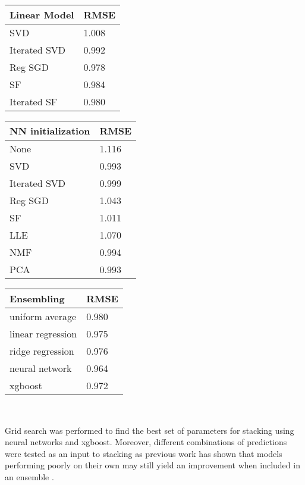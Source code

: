 \documentclass[10pt,conference,compsocconf]{IEEEtran}
\begin{document}
\begin{table*}[ht!]
	\label{table:model_results}
    \centering
    \footnotesize
    \caption{Validation scores of individual models}
    \begin{tabular}[t]{|l|l|}
    \hline
    Linear Model & RMSE \\ \hline \hline
    SVD				&1.008\\ \hline
    Iterated SVD	&0.992 \\ \hline
    Reg SGD			&0.978\\ \hline
    SF				&0.984 \\ \hline
    Iterated SF		&0.980\\ \hline
    \end{tabular}
    \qquad
    \begin{tabular}[t]{|l|l|}
    \hline
    NN initialization  & RMSE  \\ \hline \hline
    None     		& 1.116 \\ \hline
    SVD             & 0.993 \\ \hline
    Iterated SVD    & 0.999 \\ \hline
    Reg SGD 		& 1.043 \\ \hline
    SF              & 1.011 \\ \hline
    LLE             & 1.070  \\ \hline
    NMF             & 0.994 \\ \hline
    PCA             & 0.993 \\ \hline
    \end{tabular}
    \qquad
    \begin{tabular}[t]{|l|l|}
    \hline
    Ensembling & RMSE  \\ \hline
    uniform average     & 0.980 \\ \hline
    linear regression             & 0.975 \\ \hline
    ridge regression    & 0.976 \\ \hline
    neural network             & 0.964 \\ \hline
    xgboost             & 0.972 \\ \hline
    \end{tabular}
    \\
\end{table*}

Grid search was performed to find the best set of parameters for stacking using neural networks and xgboost. Moreover, different combinations of predictions were tested as an input to stacking as previous work has shown that models performing poorly on their own may still yield an improvement when included in an ensemble \cite{Jahrer2010}.
\end{document}
